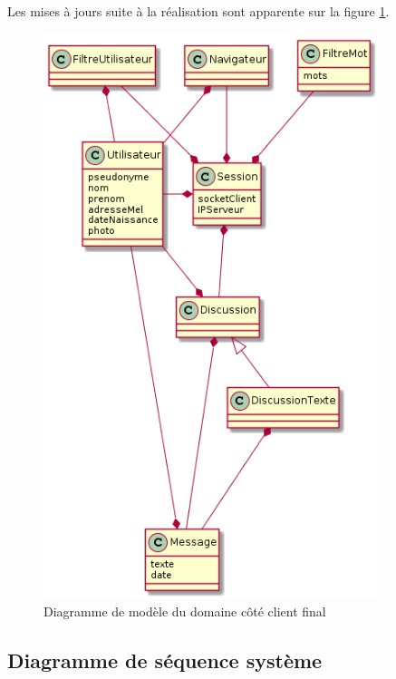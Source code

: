 		Les mises à jours suite à la réalisation sont apparente sur la figure \ref{modeleDomaineClientFinal}.

	\begin{figure}[H]
	\centerline{\includegraphics[height=16.5cm]{img/modeleDomaineClientFinal.png}}
		\caption{Diagramme de modèle du domaine côté client final}
		\label{modeleDomaineClientFinal}
	\end{figure}

	\newpage

	\subsection{Diagramme de séquence système}



